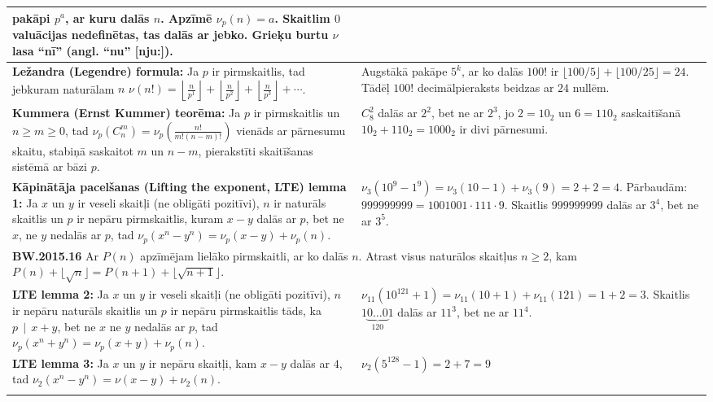 \documentclass[a4paper]{article}
\begin{document}
\begin{table}[ht!]
{\begin{tabular*}{18.46cm}{@{}|p{10.35cm}|p{7.25cm}|@{}}
{pakāpi $p^a$, ar kuru dalās $n$. Apzīmē $\nu_p(n) = a$. Skaitlim $0$ valuācijas nedefinētas, tas dalās ar jebko.
Grieķu burtu $\nu$ lasa ``nī'' (angl. ``nu'' [nju:]).   
} \\ \hline
{\bf Ležandra (Legendre) formula:} Ja $p$ ir pirmskaitlis, tad jebkuram naturālam $n$ 
$\nu(n!)=\left\lfloor \frac{n}{p^1} \right\rfloor + 
\left\lfloor \frac{n}{p^2} \right\rfloor +
\left\lfloor \frac{n}{p^3} \right\rfloor + \cdots$. &
Augstākā pakāpe $5^k$, ar ko dalās $100!$ ir $\lfloor 100/5 \rfloor + \lfloor 100/25 \rfloor = 24$. 
Tādēļ $100!$ decimālpieraksts beidzas ar $24$ nullēm. \\ \hline
{\bf Kummera (Ernst Kummer) teorēma:} Ja $p$ ir pirmskaitlis un $n \geq m \geq 0$, tad 
$\nu_p\left(C^m_n\right)=\nu_p\left( \frac{n!}{m!(n-m)!} \right)$
vienāds ar pārnesumu skaitu, stabiņā saskaitot $m$ un $n-m$, pierakstīti skaitīšanas
sistēmā ar bāzi $p$. &
$C^2_8$ dalās ar $2^2$, bet ne ar $2^3$, jo $2=10_2$ un $6=110_2$ saskaitīšanā 
$10_2+110_2=1000_2$ ir divi pārnesumi. \\ \hline 
{\bf Kāpinātāja pacelšanas (Lifting the exponent, LTE) lemma 1:} Ja $x$ un $y$ ir veseli skaitļi (ne obligāti pozitīvi),
$n$ ir naturāls skaitlis un $p$ ir nepāru pirmskaitlis, kuram $x-y$ dalās ar $p$,
bet ne $x$, ne $y$ nedalās ar $p$, tad
$\nu_p\left( x^n - y^n \right) = \nu_p(x - y) + \nu_p(n)$. &
$\nu_3(10^9 - 1^9) = \nu_3(10-1)+\nu_3(9)=2+2=4$. Pārbaudām: $999999999=1001001 \cdot 111 \cdot 9$. 
Skaitlis $999999999$ dalās ar $3^4$, bet ne ar $3^5$. \\ \hline
\multicolumn{2}{|p{18.05cm}|}{
\cellcolor[HTML]{E1FFE1}
{\bf BW.2015.16} Ar $P(n)$ apzīmējam lielāko pirmskaitli, ar ko dalās $n$. Atrast
visus naturālos skaitļus $n \geq 2$, kam $P(n)+\lfloor \sqrt{n} \rfloor = P(n+1)+\lfloor \sqrt{n+1} \rfloor$. 
} \\ \hline
{\bf LTE lemma 2:} Ja $x$ un $y$ ir veseli skaitļi (ne obligāti pozitīvi),
$n$ ir nepāru naturāls skaitlis un $p$ ir nepāru pirmskaitlis tāds, ka $p\,\mid\,x+y$,
bet ne $x$ ne $y$ nedalās ar $p$, tad
$\nu_p\left( x^n + y^n \right) = \nu_p(x + y) + \nu_p(n)$. &
$\nu_{11}(10^{121}+1)=\nu_{11}(10+1) + \nu_{11}(121)=1+2=3$. 
Skaitlis $1\underbrace{0\ldots0}_{120}1$ dalās ar $11^3$, bet ne ar $11^4$. \\ \hline
{\bf LTE lemma 3:} Ja $x$ un $y$ ir nepāru skaitļi, kam $x-y$ dalās ar $4$, tad 
$\nu_2(x^n-y^n) = \nu(x − y) + \nu_2(n)$. &
$\nu_2(5^{128} - 1) = 2+7 = 9$ \\ \hline
\multicolumn{2}{|p{18.05cm}|}{
\cellcolor[HTML]{E1FFE1}
}
\end{tabular*}}
\end{table}
\end{document}
